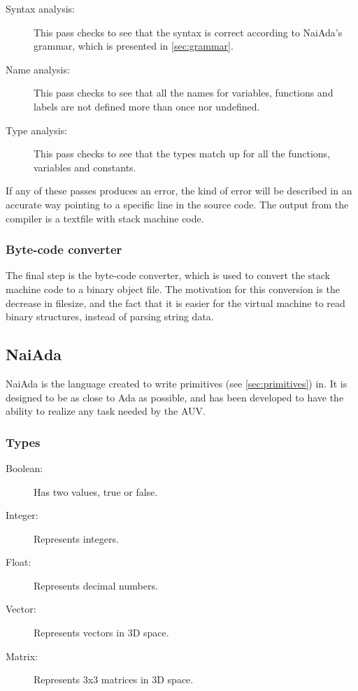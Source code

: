 \begin{description}
\item[Syntax analysis:] This pass checks to see that the syntax is correct according to NaiAda's grammar, which is presented in \cref{sec:grammar}.
\item[Name analysis:] This pass checks to see that all the names for variables, functions and labels are not defined more than once nor undefined.
\item[Type analysis:] This pass checks to see that the types match up for all the functions, variables and constants.
\end{description}

If any of these passes produces an error, the kind of error will be described in an accurate way pointing to a specific line in the source code. The output from the compiler is a textfile with stack machine code.

\subsubsection{Byte-code converter}
The final step is the byte-code converter, which is used to convert the stack machine code to a binary object file. The motivation for this conversion is the decrease in filesize, and the fact that it is easier for the virtual machine to read binary structures, instead of parsing string data.


\subsection{NaiAda}
\label{sec:naiada}
NaiAda is the language created to write primitives (see \cref{sec:primitives}) in. It is designed to be as close to Ada as possible, and has been developed to have the ability to realize any task needed by the AUV.
\subsubsection{Types}
\begin{description}
\item[Boolean:] Has two values, true or false.
\item[Integer:] Represents integers.
\item[Float:] Represents decimal numbers.
\item[Vector:] Represents vectors in 3D space.
\item[Matrix:] Represents 3x3 matrices in 3D space.
\end{description}

